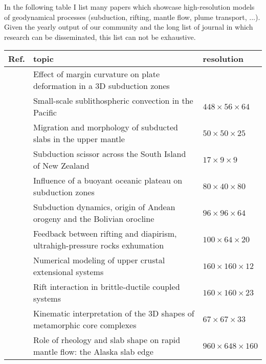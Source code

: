 
In the following table I list many papers which showcase high-resolution models of 
geodynamical processes (subduction, rifting, mantle flow, plume transport, ...).
Given the yearly output of our community and the long list of journal in which 
research can be disseminated, this list can not be exhaustive.

\noindent
{\small
\begin{tabular}{lll}
\hline
Ref.     & topic   & resolution \\
\hline
\hline
\cite{boht08b}& Effect of margin curvature on plate deformation in a 3D subduction zones        & \\
\cite{baiv10} & Small-scale sublithospheric convection in the Pacific                           & $448\times56\times64$ \\ 
\cite{stsf10} & Migration and morphology of subducted slabs in the upper mantle                 & $50\times50\times25$ \\
\cite{pyeg10} & Subduction scissor across the South Island of New Zealand                       & $17\times9\times9$ \\
\cite{mamb10} & Influence of a buoyant oceanic plateau on subduction zones                      & $80\times 40 \times80$ \\%
\cite{cafz11} & Subduction dynamics, origin of Andean orogeny and the Bolivian orocline         & $96\times96\times64$ \\%
\cite{ellw11} & Feedback between rifting and diapirism, ultrahigh-pressure rocks exhumation     & $100\times64\times20$ \\%
\cite{alht11} & Numerical modeling of upper crustal extensional systems                         & $160\times160\times12$ \\%
\cite{alht12} & Rift interaction in brittle-ductile coupled systems                             & $160\times160\times23$ \\%
\cite{lehm12} & Kinematic interpretation of the 3D shapes of metamorphic core complexes         & $67\times67\times33$ \\%
\cite{jabi12} & Role of rheology and slab shape on rapid mantle flow: the Alaska slab edge      & $960\times648\times160$ \\%

\end{tabular}}
